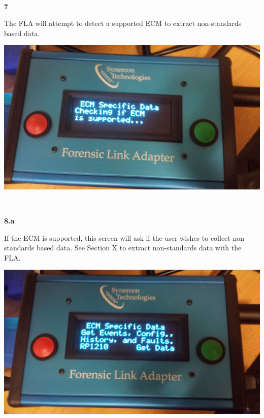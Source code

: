 \documentclass[11pt, oneside]{book}
\begin{document}
\\[\baselineskip]
\noindent\begin{minipage}{0.45\textwidth}%
\begin{center}
\textbf{7}\\[\baselineskip]
\end{center}
The FLA will attempt to detect a supported ECM to extract non-standards based data.
\end{minipage}%
\hfill%
\begin{minipage}{0.45\textwidth}
\includegraphics[width=\linewidth]{../media/fla_screens/ecm_check}
\end{minipage}
\\[\baselineskip]
\noindent\begin{minipage}{0.45\textwidth}%
\begin{center}
\textbf{8.a}\\[\baselineskip]
\end{center}
If the ECM is supported, this screen will ask if the user wishes to collect non-standards based data. See Section X to extract non-standards data with the FLA.
\end{minipage}%
\hfill%
\begin{minipage}{0.45\textwidth}
\includegraphics[width=\linewidth]{../media/fla_screens/ecm_confirm}
\end{minipage}
\end{document}
